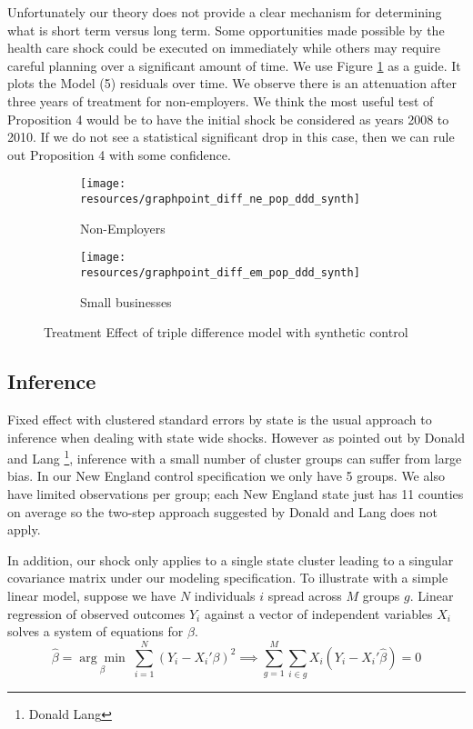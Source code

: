 \documentclass[12pt]{article}
\begin{document}
Unfortunately our theory does not provide a clear mechanism for determining what is short term versus long term. Some opportunities made possible by the health care shock could be executed on immediately while others may require careful planning over a significant amount of time. We use Figure \ref{fig:ddd} as a guide. It plots the Model (5) residuals over time. We observe there is an attenuation after three years of treatment for non-employers. We think the most useful test of Proposition 4 would be to have the initial shock be considered as years 2008 to 2010. If we do not see a statistical significant drop in this case, then we can rule out Proposition 4 with some confidence. 
\begin{figure}[H]
	\centering
	\begin{subfigure}[b]{0.495\textwidth}
		\texttt{[image: resources/graphpoint\_diff\_ne\_pop\_ddd\_synth]}
		\caption{Non-Employers}
	\end{subfigure}
		\begin{subfigure}[b]{0.495\textwidth}
		\texttt{[image: resources/graphpoint\_diff\_em\_pop\_ddd\_synth]}
		\caption{Small businesses}
	\end{subfigure}
	\caption{Treatment Effect of triple difference model with synthetic control}
	\label{fig:ddd}
\end{figure}

\subsection{Inference}

Fixed effect with clustered standard errors by state is the usual approach to inference when dealing with state wide shocks. However as pointed out by Donald and Lang \footnote{Donald Lang}, inference with a small number of cluster groups can suffer from large bias. In our New England control specification we only have 5 groups. We also have limited observations per group; each New England state just has 11 counties on average so the two-step approach suggested by Donald and Lang does not apply. 

In addition, our shock only applies to a single state cluster leading to a singular covariance matrix under our modeling specification. To illustrate with a simple linear model, suppose we have $N$ individuals $i$ spread across $M$ groups $g$. Linear regression of observed outcomes $Y_i$ against a vector of independent variables $X_i$ solves a system of equations for $\beta$. 
$$ \hat{\beta} = \underset{\beta}{\arg \min} \; \sum_{i=1}^{N} (Y_i - X_i' \beta)^2 \implies \sum_{g=1}^{M} \sum_{i \in g} X_i(Y_i - X_i' \hat{\beta}) = 0$$
\end{document}
